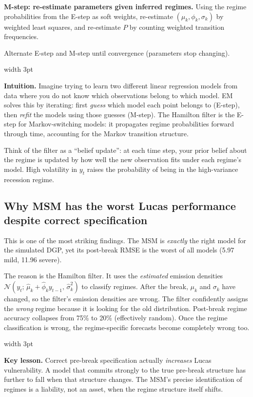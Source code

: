 \documentclass[11pt, a4paper]{article}
\newenvironment{intubox}{%
  \vspace{4pt}\par\noindent%
  {\color{darkblue}\vrule width 3pt}\hspace{6pt}%
  \begin{minipage}{\dimexpr\linewidth-9pt\relax}\vspace{2pt}%
}{%
  \vspace{2pt}\end{minipage}\par\vspace{4pt}%
}
\newenvironment{notebox}{%
  \vspace{4pt}\par\noindent%
  {\color{gold}\vrule width 3pt}\hspace{6pt}%
  \begin{minipage}{\dimexpr\linewidth-9pt\relax}\vspace{2pt}%
}{%
  \vspace{2pt}\end{minipage}\par\vspace{4pt}%
}
\begin{document}
\medskip
\textbf{M-step: re-estimate parameters given inferred regimes.}
Using the regime probabilities from the E-step as soft weights, re-estimate
$(\mu_k, \phi_k, \sigma_k)$ by weighted least squares, and re-estimate $P$ by
counting weighted transition frequencies.

\medskip
Alternate E-step and M-step until convergence (parameters stop changing).

\begin{intubox}
\textbf{Intuition.}
Imagine trying to learn two different linear regression models from data where
you do not know which observations belong to which model. EM solves this by
iterating: first \emph{guess} which model each point belongs to (E-step), then
\emph{refit} the models using those guesses (M-step). The Hamilton filter is
the E-step for Markov-switching models: it propagates regime probabilities
forward through time, accounting for the Markov transition structure.

Think of the filter as a ``belief update'': at each time step, your prior belief
about the regime is updated by how well the new observation fits under each
regime's model. High volatility in $y_t$ raises the probability of being in the
high-variance recession regime.
\end{intubox}

\subsection{Why MSM has the worst Lucas performance despite correct specification}

This is one of the most striking findings. The MSM is \emph{exactly} the right
model for the simulated DGP, yet its post-break RMSE is the worst of all models
(5.97 mild, 11.96 severe).

The reason is the Hamilton filter. It uses the \emph{estimated} emission
densities $\mathcal{N}(y_t;\,\hat\mu_k + \hat\phi_k y_{t-1},\,\hat\sigma_k^2)$
to classify regimes. After the break, $\mu_k$ and $\sigma_k$ have changed, so
the filter's emission densities are wrong. The filter confidently assigns the
\emph{wrong} regime because it is looking for the old distribution. Post-break
regime accuracy collapses from 75\% to 20\% (effectively random). Once the
regime classification is wrong, the regime-specific forecasts become completely
wrong too.

\begin{notebox}
\textbf{Key lesson.}
Correct pre-break specification actually \emph{increases} Lucas vulnerability.
A model that commits strongly to the true pre-break structure has further to
fall when that structure changes. The MSM's precise identification of regimes
is a liability, not an asset, when the regime structure itself shifts.
\end{notebox}
\end{document}
